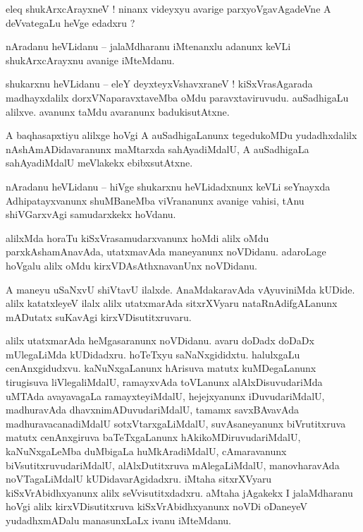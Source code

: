 \documentclass{article}
\begin{document}
\begin{mn}%
eleq shukArxcArayxneV ! ninanx videyxyu avarige parxyoVgavAgadeVne A deVvategaLu heVge 
edadxru ?
\end{mn}

\begin{mn}%
nAradanu heVLidanu -- jalaMdharanu iMtenanxlu adanunx keVLi shukArxcArayxnu avanige iMteMdanu.
\end{mn}

\begin{mn}%
shukarxnu heVLidanu -- eleY deyxteyxVshavxraneV ! kiSxVrasAgarada madhayxdalilx 
dorxVNaparavxtaveMba oMdu paravxtaviruvudu. auSadhigaLu alilxve. avanunx taMdu avaranunx 
badukisutAtxne.
\end{mn}

\begin{mn}%
A baqhasapxtiyu alilxge hoVgi A auSadhigaLanunx tegedukoMDu yudadhxdalilx 
nAshAmADidavaranunx maMtarxda sahAyadiMdalU, A auSadhigaLa sahAyadiMdalU meVlakekx 
ebibxsutAtxne.
\end{mn}

\begin{mn}%
nAradanu heVLidanu -- hiVge shukarxnu heVLidadxnunx keVLi seYnayxda Adhipatayxvanunx 
shuMBaneMba viVrananunx avanige vahisi, tAnu shiVGarxvAgi samudarxkekx hoVdanu.
\end{mn}

\begin{mn}%
alilxMda horaTu kiSxVrasamudarxvanunx hoMdi alilx oMdu parxkAshamAnavAda, utatxmavAda 
maneyanunx noVDidanu. adaroLage hoVgalu alilx oMdu kirxVDAsAthxnavanUnx noVDidanu.
\end{mn}

\begin{mn}%
A maneyu uSaNxvU shiVtavU ilalxde. AnaMdakaravAda vAyuviniMda kUDide. alilx katatxleyeV 
ilalx alilx utatxmarAda sitxrXVyaru nataRnAdifgALanunx mADutatx suKavAgi kirxVDisutitxruvaru.
\end{mn}

\begin{mn}%
alilx utatxmarAda heMgasaranunx noVDidanu. avaru doDadx doDaDx mUlegaLiMda kUDidadxru. 
hoTeTxyu saNaNxgididxtu. halulxgaLu cenAnxgidudxvu. kaNuNxgaLanunx hArisuva matutx 
kuMDegaLanunx tirugisuva liVlegaliMdalU, ramayxvAda toVLanunx alAlxDisuvudariMda uMTAda 
avayavagaLa ramayxteyiMdalU, hejejxyanunx iDuvudariMdalU, madhuravAda 
dhavxnimADuvudariMdalU, tamamx savxBAvavAda madhuravacanadiMdalU sotxVtarxgaLiMdalU, 
suvAsaneyanunx biVrutitxruva matutx cenAnxgiruva baTeTxgaLanunx hAkikoMDiruvudariMdalU, 
kaNuNxgaLeMba duMbigaLa huMkAradiMdalU, cAmaravanunx biVsutitxruvudariMdalU, 
alAlxDutitxruva mAlegaLiMdalU, manovharavAda noVTagaLiMdalU kUDidavarAgidadxru. iMtaha 
sitxrXVyaru kiSxVrAbidhxyanunx alilx seVvisutitxdadxru. aMtaha jAgakekx I jalaMdharanu 
hoVgi alilx kirxVDisutitxruva kiSxVrAbidhxyanunx noVDi oDaneyeV yudadhxmADalu manasunxLaLx 
ivanu iMteMdanu.
\end{mn}
\end{document}

